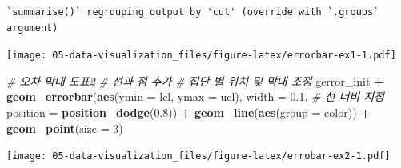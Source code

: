 \documentclass[
  11pt,
]{krantz}
\newenvironment{Shaded}{\begin{snugshade}}{\end{snugshade}}
\newcommand{\CommentTok}[1]{\textcolor[rgb]{0.37,0.37,0.37}{\textit{#1}}}
\newcommand{\DataTypeTok}[1]{\textcolor[rgb]{0.27,0.27,0.27}{#1}}
\newcommand{\DecValTok}[1]{\textcolor[rgb]{0.06,0.06,0.06}{#1}}
\newcommand{\FloatTok}[1]{\textcolor[rgb]{0.06,0.06,0.06}{#1}}
\newcommand{\KeywordTok}[1]{\textcolor[rgb]{0.27,0.27,0.27}{\textbf{#1}}}
\newcommand{\NormalTok}[1]{#1}
\newcommand{\OperatorTok}[1]{\textcolor[rgb]{0.43,0.43,0.43}{\textbf{#1}}}
\newcommand{\StringTok}[1]{\textcolor[rgb]{0.5,0.5,0.5}{#1}}
\begin{document}
\begin{verbatim}
`summarise()` regrouping output by 'cut' (override with `.groups` argument)
\end{verbatim}

\begin{Shaded}
\end{Shaded}

\texttt{[image: 05-data-visualization\_files/figure-latex/errorbar-ex1-1.pdf]}

\normalsize

\footnotesize

\begin{Shaded}
\begin{Highlighting}[]
\CommentTok{# 오차 막대 도표2}
\CommentTok{# 선과 점 추가}
\CommentTok{# 집단 별 위치 및 막대 조정}
\NormalTok{gerror_init }\OperatorTok{+}\StringTok{ }
\StringTok{  }\KeywordTok{geom_errorbar}\NormalTok{(}\KeywordTok{aes}\NormalTok{(}\DataTypeTok{ymin =}\NormalTok{ lcl, }
                    \DataTypeTok{ymax =}\NormalTok{ ucl), }
                \DataTypeTok{width =} \FloatTok{0.1}\NormalTok{,  }\CommentTok{# 선 너비 지정}
                \DataTypeTok{position =} \KeywordTok{position_dodge}\NormalTok{(}\FloatTok{0.8}\NormalTok{)) }\OperatorTok{+}\StringTok{ }
\StringTok{  }\KeywordTok{geom_line}\NormalTok{(}\KeywordTok{aes}\NormalTok{(}\DataTypeTok{group =}\NormalTok{ color)) }\OperatorTok{+}\StringTok{ }
\StringTok{  }\KeywordTok{geom_point}\NormalTok{(}\DataTypeTok{size =} \DecValTok{3}\NormalTok{)}
\end{Highlighting}
\end{Shaded}

\texttt{[image: 05-data-visualization\_files/figure-latex/errobar-ex2-1.pdf]}

\normalsize
\end{document}
